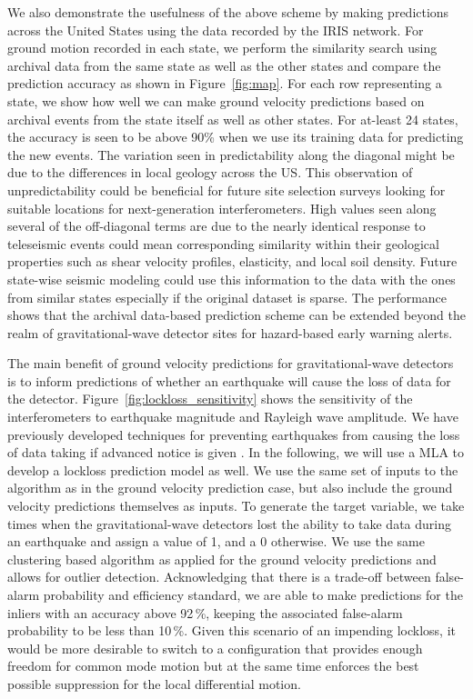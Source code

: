 \documentclass[twocolumn, aps, superscriptaddress]{revtex4}
\begin{document}
We also demonstrate the usefulness of the above scheme by making predictions across the United States using the data recorded by the IRIS network. For ground motion recorded in each state, we perform the similarity search using archival data from the same state as well as the other states and compare the prediction accuracy as shown in Figure~\ref{fig:map}. For each row representing a state, we show how well we can make ground velocity predictions based on archival events from the state itself as well as other states. For at-least 24 states, the accuracy is seen to be above 90\% when we use its training data for predicting the new events. The variation seen in predictability along the diagonal might be due to the differences in local geology across the US. This observation of unpredictability could be beneficial for future site selection surveys looking for suitable locations for next-generation interferometers. High values seen along several of the off-diagonal terms are due to the nearly identical response to teleseismic events could mean corresponding similarity within their geological properties such as shear velocity profiles, elasticity, and local soil density. Future state-wise seismic modeling could use this information to the data with the ones from similar states especially if the original dataset is sparse. The performance shows that the archival data-based prediction scheme can be extended beyond the realm of gravitational-wave detector sites for hazard-based early warning alerts.

The main benefit of ground velocity predictions for gravitational-wave detectors is to inform predictions of whether an earthquake will cause the loss of data for the detector. Figure~\ref{fig:lockloss_sensitivity} shows the sensitivity of the interferometers to earthquake magnitude and Rayleigh wave amplitude.
We have previously developed techniques for preventing earthquakes from causing the loss of data taking if advanced notice is given \cite{BiWa2018}.
In the following, we will use a MLA to develop a lockloss prediction model as well. 
We use the same set of inputs to the algorithm as in the ground velocity prediction case, but also include the ground velocity predictions themselves as inputs.
To generate the target variable, we take times when the gravitational-wave detectors lost the ability to take data during an earthquake and assign a value of 1, and a 0 otherwise. We use the same clustering based algorithm as applied for the ground velocity predictions and allows for outlier detection.
Acknowledging that there is a trade-off between false-alarm probability and efficiency standard, 
we are able to make predictions for the inliers with an accuracy above 92\,\%, keeping the associated false-alarm probability to be less than 10\,\%. Given this scenario of an impending lockloss, it would be more desirable to switch to a configuration that provides enough freedom for common mode motion but at the same time enforces the best possible suppression for the local differential motion.
\end{document}
